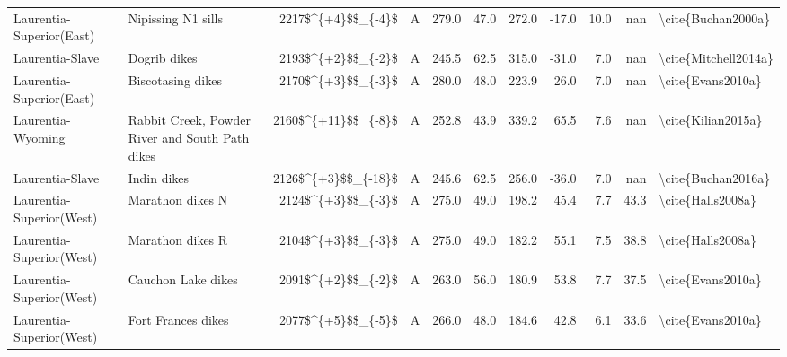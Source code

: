 \begin{longtable}{p{1 in}p{1 in}rrrrrrrr}
      Laurentia-Superior(East) &                                 Nipissing N1 sills &     2217\$\textasciicircum \{+4\}\$\$\_\{-4\}\$ &      A &     279.0 &      47.0 & 272.0 & -17.0 &      10.0 &         nan &                                 \textbackslash cite\{Buchan2000a\} \\
               Laurentia-Slave &                                       Dogrib dikes &     2193\$\textasciicircum \{+2\}\$\$\_\{-2\}\$ &      A &     245.5 &      62.5 & 315.0 & -31.0 &       7.0 &         nan &                               \textbackslash cite\{Mitchell2014a\} \\
      Laurentia-Superior(East) &                                  Biscotasing dikes &     2170\$\textasciicircum \{+3\}\$\$\_\{-3\}\$ &      A &     280.0 &      48.0 & 223.9 &  26.0 &       7.0 &         nan &                                  \textbackslash cite\{Evans2010a\} \\
             Laurentia-Wyoming &    Rabbit Creek, Powder River and South Path dikes &    2160\$\textasciicircum \{+11\}\$\$\_\{-8\}\$ &      A &     252.8 &      43.9 & 339.2 &  65.5 &       7.6 &         nan &                                 \textbackslash cite\{Kilian2015a\} \\
               Laurentia-Slave &                                        Indin dikes &    2126\$\textasciicircum \{+3\}\$\$\_\{-18\}\$ &      A &     245.6 &      62.5 & 256.0 & -36.0 &       7.0 &         nan &                                 \textbackslash cite\{Buchan2016a\} \\
      Laurentia-Superior(West) &                                   Marathon dikes N &     2124\$\textasciicircum \{+3\}\$\$\_\{-3\}\$ &      A &     275.0 &      49.0 & 198.2 &  45.4 &       7.7 &        43.3 &                                  \textbackslash cite\{Halls2008a\} \\
      Laurentia-Superior(West) &                                   Marathon dikes R &     2104\$\textasciicircum \{+3\}\$\$\_\{-3\}\$ &      A &     275.0 &      49.0 & 182.2 &  55.1 &       7.5 &        38.8 &                                  \textbackslash cite\{Halls2008a\} \\
      Laurentia-Superior(West) &                                 Cauchon Lake dikes &     2091\$\textasciicircum \{+2\}\$\$\_\{-2\}\$ &      A &     263.0 &      56.0 & 180.9 &  53.8 &       7.7 &        37.5 &                                  \textbackslash cite\{Evans2010a\} \\
      Laurentia-Superior(West) &                                 Fort Frances dikes &     2077\$\textasciicircum \{+5\}\$\$\_\{-5\}\$ &      A &     266.0 &      48.0 & 184.6 &  42.8 &       6.1 &        33.6 &                                  \textbackslash cite\{Evans2010a\} \\

\end{longtable}
